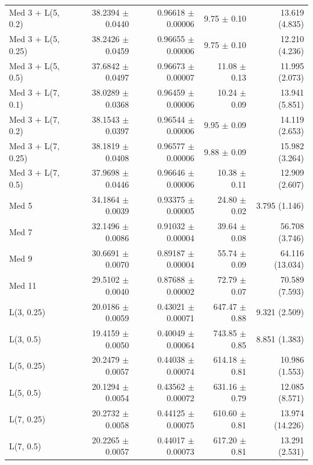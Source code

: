 \begin{longtable}{lrrrr}
Med 3 + L(5, 0.2) & 38.2394 $\pm$ 0.0440 & 0.96618 $\pm$ 0.00006 & 9.75 $\pm$ 0.10 & 13.619 (4.835) \\
Med 3 + L(5, 0.25) & 38.2426 $\pm$ 0.0459 & 0.96655 $\pm$ 0.00006 & 9.75 $\pm$ 0.10 & 12.210 (4.236) \\
Med 3 + L(5, 0.5) & 37.6842 $\pm$ 0.0497 & 0.96673 $\pm$ 0.00007 & 11.08 $\pm$ 0.13 & 11.995 (2.073) \\
Med 3 + L(7, 0.1) & 38.0289 $\pm$ 0.0368 & 0.96459 $\pm$ 0.00006 & 10.24 $\pm$ 0.09 & 13.941 (5.851) \\
Med 3 + L(7, 0.2) & 38.1543 $\pm$ 0.0397 & 0.96544 $\pm$ 0.00006 & 9.95 $\pm$ 0.09 & 14.119 (2.653) \\
Med 3 + L(7, 0.25) & 38.1819 $\pm$ 0.0408 & 0.96577 $\pm$ 0.00006 & 9.88 $\pm$ 0.09 & 15.982 (3.264) \\
Med 3 + L(7, 0.5) & 37.9698 $\pm$ 0.0446 & 0.96646 $\pm$ 0.00006 & 10.38 $\pm$ 0.11 & 12.909 (2.607) \\
Med 5 & 34.1864 $\pm$ 0.0039 & 0.93375 $\pm$ 0.00005 & 24.80 $\pm$ 0.02 & 3.795 (1.146) \\
Med 7 & 32.1496 $\pm$ 0.0086 & 0.91032 $\pm$ 0.00004 & 39.64 $\pm$ 0.08 & 56.708 (3.746) \\
Med 9 & 30.6691 $\pm$ 0.0070 & 0.89187 $\pm$ 0.00004 & 55.74 $\pm$ 0.09 & 64.116 (13.034) \\
Med 11 & 29.5102 $\pm$ 0.0040 & 0.87688 $\pm$ 0.00002 & 72.79 $\pm$ 0.07 & 70.589 (7.593) \\
L(3, 0.25) & 20.0186 $\pm$ 0.0059 & 0.43021 $\pm$ 0.00071 & 647.47 $\pm$ 0.88 & 9.321 (2.509) \\
L(3, 0.5) & 19.4159 $\pm$ 0.0050 & 0.40049 $\pm$ 0.00064 & 743.85 $\pm$ 0.85 & 8.851 (1.383) \\
L(5, 0.25) & 20.2479 $\pm$ 0.0057 & 0.44038 $\pm$ 0.00074 & 614.18 $\pm$ 0.81 & 10.986 (1.553) \\
L(5, 0.5) & 20.1294 $\pm$ 0.0054 & 0.43562 $\pm$ 0.00072 & 631.16 $\pm$ 0.79 & 12.085 (8.571) \\
L(7, 0.25) & 20.2732 $\pm$ 0.0058 & 0.44125 $\pm$ 0.00075 & 610.60 $\pm$ 0.81 & 13.974 (14.226) \\
L(7, 0.5) & 20.2265 $\pm$ 0.0057 & 0.44017 $\pm$ 0.00073 & 617.20 $\pm$ 0.81 & 13.291 (2.531) \\
\end{longtable}
\endgroup
